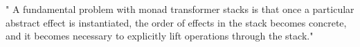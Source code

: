 \cite{king1993combining}



"
A fundamental problem with monad transformer stacks is that
once a particular abstract effect is instantiated,
the order of effects in the stack becomes concrete,
and it becomes necessary to explicitly lift operations
through the stack."
\cite{kammar2013handlers}
